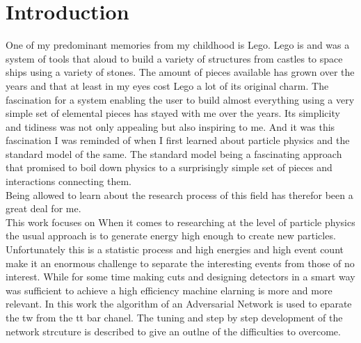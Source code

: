 \chapter{Introduction}
\label{sec:intro}
One of my predominant memories from my childhood is Lego. Lego is and was a system of tools that aloud to build a variety of structures from castles to space ships using a variety of stones. The amount of pieces available has grown over the years and that at least in my eyes cost Lego a lot of its original charm. The fascination for a system enabling the user to build almost everything using a very simple set of elemental pieces has stayed with me over the years. Its simplicity and tidiness was not only appealing but also inspiring to me. 
And it was this fascination I was reminded of when I first learned about particle physics and the standard model of the same. The standard model being a fascinating approach that promised to boil down physics to a surprisingly simple set of pieces and interactions connecting them.\\
Being allowed to learn about the research process of this field has therefor been a great deal for me.\\
This work focuses on 
When it comes to researching at the level of particle physics the usual approach is to generate energy high enough to create new particles. Unfortunately this is a statistic process and high energies and high event count make it an enormous challenge to separate the interesting events from those of no interest. While for some time making cuts and designing detectors in a smart way was sufficient to achieve a high efficiency machine elarning is more and more relevant.
In this work the algorithm of an Adversarial Network is used to eparate the tw from the tt bar chanel. The tuning and step by step development of the network strcuture is described to give an outlne of the difficulties to overcome.
